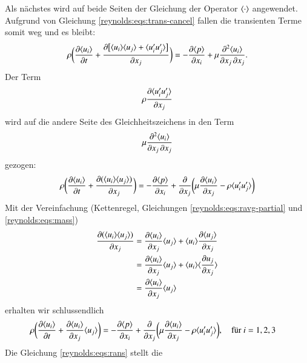 %
Als nächstes wird auf beide Seiten der Gleichung der Operator $\ravg{\cdot}$ angewendet.
Aufgrund von Gleichung \eqref{reynolds:eqs:trans-cancel} fallen die transienten Terme somit
weg und es bleibt:
%
\begin{equation*}
    \rho \biggl(
            \frac{\partial \ravg{u_i}}{\partial t} +
            \frac{\partial \bigl[ \ravg{u_i} \ravg{u_j} + \ravg{u_i' u_j'} \bigr]}{\partial x_j}
        \biggr) =
        - \frac{\partial \ravg{p}}{\partial x_i} + 
        \mu \frac{\partial^2 \ravg{u_i}}{\partial x_j\, \partial x_j}.
\end{equation*}
%
Der Term 
%
$$\rho \frac{\partial \ravg{u_i' u_j'}}{\partial x_j}$$
%
wird auf die andere Seite des Gleichheitszeichens in den Term 
%
$$\mu \frac{\partial^2 \ravg{u_i}}{\partial x_j\, \partial x_j}$$
%
gezogen:
%
\begin{equation*}
    \rho \biggl(
            \frac{\partial \ravg{u_i}}{\partial t} +
            \frac{\partial ( \ravg{u_i} \ravg{u_j})}{\partial x_j}
        \biggr) =
        - \frac{\partial \ravg{p}}{\partial x_i} + 
            \frac{\partial}{\partial x_j} 
                \biggl(
                    \mu \frac{\partial \ravg{u_i}}{\partial x_j} - \rho \ravg{u_i' u_j'}
                \biggr)
\end{equation*}
%
Mit der Vereinfachung (Kettenregel, Gleichungen \eqref{reynolds:eqs:ravg-partial} und \eqref{reynolds:eqs:mass})
%
\begin{align*}
    \frac{\partial ( \ravg{u_i} \ravg{u_j})}{\partial x_j} &=
    \frac{\partial \ravg{u_i}}{\partial x_j} \ravg{u_j} +
    \ravg{u_i} \frac{\partial \ravg{u_j}}{\partial x_j} \\
    &= \frac{\partial \ravg{u_i}}{\partial x_j} \ravg{u_j} +
    \ravg{u_i} \ravg{\frac{\partial u_j}{\partial x_j}} \\
    &= \frac{\partial \ravg{u_i}}{\partial x_j} \ravg{u_j}
\end{align*}
%
erhalten wir schlussendlich
%
\begin{align}
    \label{reynolds:eqs:rans}
    \rho \biggl(
            \frac{\partial \ravg{u_i}}{\partial t} +
            \frac{\partial \ravg{u_i}}{\partial x_j} \ravg{u_j}
        \biggr) &=
        - \frac{\partial \ravg{p}}{\partial x_i} + 
            \frac{\partial}{\partial x_j}
            \biggl(
                \mu \frac{\partial \ravg{u_i}}{\partial x_j} - \rho \ravg{u_i' u_j'}
            \biggr),\quad\text{für $i=1,2,3$}
\end{align}
%
Die Gleichung \eqref{reynolds:eqs:rans} stellt die
